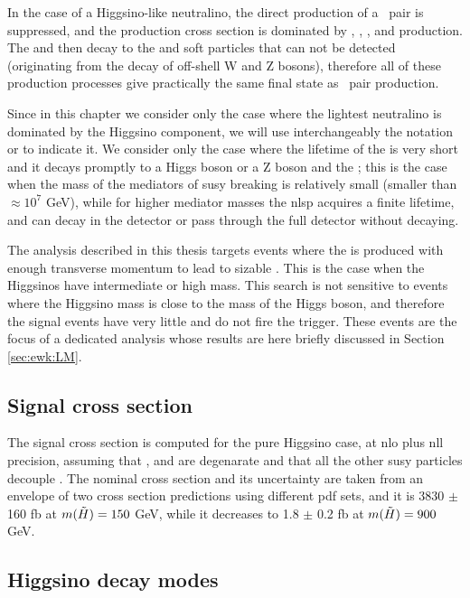 In the case of a Higgsino-like neutralino, the direct production of a \ninoone\ninoone\ pair is suppressed, and the production cross section is dominated by 
\ninoone\ninotwo, \ninoone\chinoonepm, \ninotwo\chinoonepm, and \chinoonep\chinoonem production.
The \ninotwo and \chinoonepm then decay to the \ninoone and soft particles that can not be detected (originating from the 
decay of off-shell W and Z bosons), therefore all of these production processes give practically the same final state as 
\ninoone\ninoone\  pair production. 

Since in this chapter we consider only the case where the lightest neutralino is dominated by the Higgsino component,
we will use interchangeably the notation \ninoone or \hino to indicate it.  
We consider only the case where the lifetime of the \hino is very short and it decays promptly to a Higgs boson or a Z boson and the \gravino;
this is the case when the mass of the mediators of \gls{susy} breaking is relatively small (smaller than $\approx 10^7$ GeV), 
while for higher mediator masses the \gls{nlsp} acquires a finite lifetime, and can decay in the detector or pass
 through the full detector without decaying. 

The analysis described in this thesis targets events where the \gravino is produced with enough transverse momentum to lead to 
sizable \met. This is the case when the Higgsinos have intermediate or high mass.
This search is not sensitive to events where the Higgsino mass is close to the mass of the Higgs boson, and therefore 
the signal events have very little \met and do not fire the \met trigger.
These events are the focus of a dedicated analysis whose results are here briefly discussed in Section \ref{sec:ewk:LM}.


\subsection{Signal cross section}

The signal cross section is computed for the pure Higgsino case, at \gls{nlo} plus \gls{nll} precision, assuming that
\ninoone, \ninotwo and \chinoonepm are degenarate and that all the other \gls{susy} particles decouple \cite{Fuks:2012qx,Fuks:2013vua}.
The nominal cross section and its uncertainty are taken from an envelope of two cross section predictions using different \gls{pdf} sets, 
and it is 3830 $\pm$ 160 fb at $m(\tilde{H}) = 150$ GeV, while it decreases to 1.8 $\pm$ 0.2 fb at $m(\tilde{H}) = 900$ GeV. 

\subsection{Higgsino decay modes}

